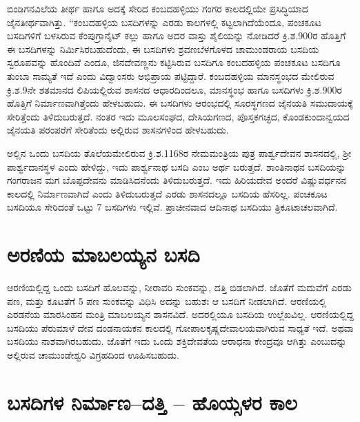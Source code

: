 ಬಿಂಡಿಗನವಿಲೆಯ ತೀರ್ಥ ಹಾಗೂ ಅದಕ್ಕೆ ಸೇರಿದ ಕಂಬದಹಳ್ಳಿಯು ಗಂಗರ ಕಾಲದಲ್ಲಿಯೇ ಪ್ರಸಿದ್ಧಿಯಾದ ಜೈನತೀರ್ಥವಾಗಿತ್ತು. “ಕಂಬದಹಳ್ಳಿಯ ಬಸದಿಗಳನ್ನು ಎರಡು ಕಾಲಗಳಲ್ಲಿ ಕಟ್ಟಲಾಗಿದೆಯೆಂದೂ, ಪಂಚಕೂಟ ಬಸದಿಗಳಿಗೆ ಬಳಸಿರುವ ಕೆಂಪುಗ್ರಾನೈಟ್​ ಕಲ್ಲು ಹಾಗೂ ಅದರ ವಾಸ್ತು ಶೈಲಿಯನ್ನು ನೋಡಿದರೆ ಕ್ರಿ.ಶ.900ರ ಹೊತ್ತಿಗೆ ಈ ಬಸದಿಗಳನ್ನು ನಿರ್ಮಿಸಿರಬಹುದೆಂದು, ಈ ಬಸದಿಗಳು ಶ್ರವಣಬೆಳಗೊಳದ ಚಾಮುಂಡರಾಯ ಬಸದಿಯ ಸ್ವರೂಪವನ್ನು ಹೊಂದಿವೆ ಎಂದೂ, ಜಿನದೇವಣ್ಣನು ಕಟ್ಟಿಸಿರುವ ಬಸದಿಗೂ ಕಂಬದಹಳ್ಳಿಯ ಪಂಚಕೂಟ ಬಸದಿಗೂ ತುಂಬಾ ಸಾಮ್ಯತೆ ಇದೆ ಎಂದು ವಿದ್ವಾಂಸರು ಅಭಿಪ್ರಾಯ ಪಟ್ಟಿದ್ದಾರೆ. ಕಂಬದಹಳ್ಳಿಯ ಮಾನಸ್ಥಂಭದ ಮೇಲಿರುವ ಕ್ರಿ.ಶ.9ನೇ ಶತಮಾನದ ಲಿಪಿಯಲ್ಲಿರುವ ಶಾಸನದ ಆಧಾರದಿಂದಲೂ, ಮಾನಸ್ಥಂಭ ಹಾಗೂ ಬಸದಿಗಳು ಕ್ರಿ.ಶ.900ರ ಹೊತ್ತಿಗೆ ನಿರ್ಮಾಣವಾಗಿತ್ತೆಂದು ಹೇಳಬಹುದು. ಈ ಬಸದಿಗಳು ಆರಂಭದಲ್ಲಿ ಸೂರಸ್ಥಗಣದ ಜೈನಯತಿ ಸಮುದಾಯಕ್ಕೆ ಸೇರಿತ್ತೆಂದು ತಿಳಿದುಬರುತ್ತದೆ. ನಂತರ ಇದು ಮೂಲಸಂಘದ, ದೇಸಿಯಗಣದ, ಪೊಸ್ತಕಗಚ್ಛದ, ಕೊಂಡಕುಂದಾನ್ವಯದ ಜೈನಯತಿ ಪರಂಪರೆಗೆ ಸೇರಿತೆಂದು ಅಲ್ಲಿರುವ ಶಾಸನಗಳಿಂದ ಹೇಳಬಹುದು.

ಅಲ್ಲಿನ ಒಂದು ಬಸದಿಯ ತೊಲೆಯಮೇಲಿರುವ ಕ್ರಿ.ಶ.1168ರ ನೇಮಮಂತ್ರಿಯ ಪುತ್ರ ಪಾರ್ಶ್ವದೇವನ ಶಾಸನದಲ್ಲಿ, ಶ‍್ರೀ ಪಾರ್ಶ್ವದಾನಸ್ಥಳ ಎಂದು ಹೇಳಿದ್ದು, ಇದು ಪಾರ್ಶ್ವನಾಥ ಬಸದಿ ಎಂಬ ಅರ್ಥ ಬರುತ್ತದೆ. ಶಾಂತಿನಾಥನ ಬಸದಿಯನ್ನು ಗಂಗರಾಜನ ಮಗ ಬೊಪ್ಪದೇವನು ಮಾಡಿಸಿದನೆಂದು ತಿಳಿದುಬರುತ್ತದೆ. ಇದು ಹಿರಿಯದೇವ ಅಂದರೆ ವಿಷ್ಣುವರ್ಧನನ ಕಾಲದಲ್ಲಿ ನಿರ್ಮಾಣವಾಗಿದೆ ಎಂದು ತಿಳಿದುಬರುತ್ತದೆ ಎರಡು ಶಾಸನದಲ್ಲೂ ಬಸದಿಯ ಹೆಸರಿಲ್ಲ. ಪಂಚಕೂಟ ಬಸದಿಯೂ ಸೇರಿದಂತೆ ಒಟ್ಟು 7 ಬಸದಿಗಳು ಇಲ್ಲಿವೆ. ಪ್ರಾಚೀನವಾದ ಆದಿನಾಥ ಬಸದಿಯು ತ್ರಿಕೂಟಾಚಲವಾಗಿದೆ.


\section{ಅರಣಿಯ ಮಾಬಲಯ್ಯನ ಬಸದಿ}

ಆರಣಿಯಲ್ಲಿದ್ದ ಒಂದು ಬಸದಿಗೆ ಹೊಲವನ್ನು, ನೀರಾವರಿ ಸುಂಕವನ್ನು, ದತ್ತಿ ಬಿಡಲಾಗಿದೆ. ಜೊತೆಗೆ ಮದುವೆಗೆ ಎರಡು ಪಣ, ಮತ್ತು ಕೂಟತೆಗೆ 5 ಪಣ ಸುಂಕವನ್ನು ವಿಧಿಸಿ ಅದನ್ನು ಬಹುಶಃ ಆ ಬಸದಿಗೆ ನೀಡಲಾಗಿದೆ. ಆರಣಿಯಲ್ಲಿ ಎರಡನೆಯ ಮಾರಸಿಂಹನ ಮಂತ್ರಿ ಮಾಬಲಯ್ಯನ ಶಾಸನವಿದೆ. ಅದರಲ್ಲಿಯೂ ಬಸದಿಯ ಉಲ್ಲೆಖವಿಲ್ಲ. ಆರಣಿಯಲ್ಲಿದ್ದ ಬಸದಿಯು ಪೆರುಮಾಳೆ ದೇವ ದಂಡನಾಯಕನ ಕಾಲದಲ್ಲಿ ಗೋಪಾಲಕೃಷ್ಣದೇವಾಲಯವಾಗಿರುವ ಸಾಧ್ಯತೆ ಇದೆ. ಅಥವಾ ಬಸದಿಯು ನಾಶವಾಗಿರಬಹುದು. ಜೊತೆಗೆ ಇದು ಒಂದು ಶಕ್ತಿದೇವತೆಯ ಆರಾಧನಾ ಕೇಂದ್ರವೂ ಆಗಿತ್ತು ಎಂಬುದನ್ನು ಅಲ್ಲಿರುವ ಚಾಮುಂಡೇಶ್ವರಿ ವಿಗ್ರಹದಿಂದ ಊಹಿಸಬಹುದು.


\section{ಬಸದಿಗಳ ನಿರ್ಮಾಣ–ದತ್ತಿ – ಹೊಯ್ಸಳರ ಕಾಲ}

